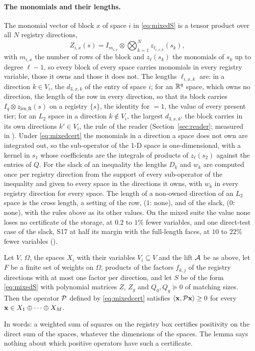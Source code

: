 \paragraph{The monomials and their lengths.} The monomial vector of block $x$ of space $i$ in \eqref{eq:mixedS} is a tensor product over all $N$ registry directions,
\begin{equation}\label{eq:mixedZ}
Z_{i,x}(s)=I_{m_{i,x}}\otimes\bigotimes_{k=1}^{N}z_{\ell_{i,x,k}}(s_k),
\end{equation}
with $m_{i,x}$ the number of rows of the block and $z_\ell(s_k)$ the monomials of $s_k$ up to degree $\ell-1$, so every block of every space carries monomials in every registry variable, those it owns and those it does not. The lengths $\ell_{i,x,k}$ are: in a direction $k\in V_i$, the $d_{3,x,k}$ of the entry of space $i$; for an $\mathbb{R}^q$ space, which owns no direction, the length  of the row in every direction, so that its block carries $I_q\otimes z_{\mathrm{len\_R}}(s)$ on a registry $\{s\}$, the identity for  $=1$, the value of every present tier; for an $L_2$ space in a direction $k\notin V_i$, the largest $d_{3,x,k'}$ the block carries in its own directions $k'\in V_i$, the rule of the reader (Section~\ref{sec:reader}; measured in \readerref). Under \eqref{eq:mixedcert} the monomials in a direction a space does not own are integrated out, so the sub-operator of the 1-D space is one-dimensional, with a kernel in $s_1$ whose coefficients are the integrals of products of $z_\ell(s_2)$ against the entries of $Q$. For the slack of an inequality the lengths $D_k$ and $w_k$ are computed once per registry direction from the support of every sub-operator of the inequality and given to every space in the directions it owns, with $w_k$ in every registry direction for every space. The length of a non-owned direction of an $L_2$ space is the cross length, a setting of the row,  ($1$: none), and of the slack,  ($0$: none), with the rules above as its other values. On the mixed suite the value none loses no certificate of the storage, at $0.2$ to $1\%$ fewer variables, and one direct-test case of the slack, S17 at half its margin with the full-length faces, at $10$ to $22\%$ fewer variables (\blcrossref).

\begin{lemma}\label{lem:mixedsuff}
Let $V$, $\Omega$, the spaces $X_i$ with their variables $V_i\subseteq V$ and the lift $\mathcal{A}$ be as above, let $F$ be a finite set of weights on $\Omega$, products of the factors $f_{k,j}$ of the registry directions with at most one factor per direction, and let $S$ be of the form \eqref{eq:mixedS} with polynomial matrices $Z$, $Z_g$ and $Q_0,Q_g\succeq0$ of matching sizes. Then the operator $\mathcal{P}$ defined by \eqref{eq:mixedcert} satisfies $\left\langle \mathbf{x},\mathcal{P}\mathbf{x}\right\rangle\ge0$ for every $\mathbf{x}\in X_1\oplus\dots\oplus X_M$.
\end{lemma}
In words: a weighted sum of squares on the registry box certifies positivity on the direct sum of the spaces, whatever the dimensions of the spaces. The lemma says nothing about which positive operators have such a certificate.

